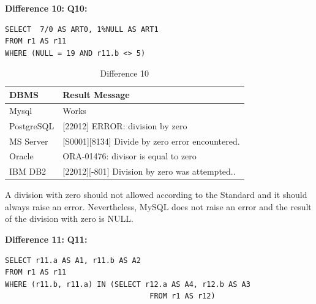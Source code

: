  
\hfill\newline\textbf{Difference 10:}
\hfill\newline\textbf{Q10:}

\begin{mdframed}[backgroundcolor=lightgray!20]
\begin{lstlisting}[style=SQL]
SELECT  7/0 AS ART0, 1%NULL AS ART1
FROM r1 AS r11
WHERE (NULL = 19 AND r11.b <> 5)   
\end{lstlisting}
\end{mdframed}
  
\begin{table}[h]
\centering
\caption{Difference 10}
\label{my-label}
\begin{tabular}
{|p{2cm}|p{11.5cm}| }
\hline
\textbf{DBMS} & \textbf{Result Message}                                 \\ \hline
Mysql         & Works                                                   \\ \hline
PostgreSQL    & {[}22012{]} ERROR: division by zero                     \\ \hline
MS Server     & {[}S0001{]}{[}8134{]} Divide by zero error encountered. \\ \hline
Oracle        & ORA-01476: divisor is equal to zero                     \\ \hline
IBM DB2       & {[}22012{]}{[}-801{]} Division by zero was attempted..  \\ \hline
\end{tabular}
\end{table}

A division with zero should not allowed  according to the Standard and it should  always raise an error. Nevertheless, MySQL does not raise an error and the result of the division with zero is NULL. 


 
\hfill\newline\textbf{Difference 11:}
\hfill\newline\textbf{Q11:}

\begin{mdframed}[backgroundcolor=lightgray!20]
\begin{lstlisting}[style=SQL]
SELECT r11.a AS A1, r11.b AS A2
FROM r1 AS r11
WHERE (r11.b, r11.a) IN (SELECT r12.a AS A4, r12.b AS A3
                         		 FROM r1 AS r12)
\end{lstlisting}
\end{mdframed}

